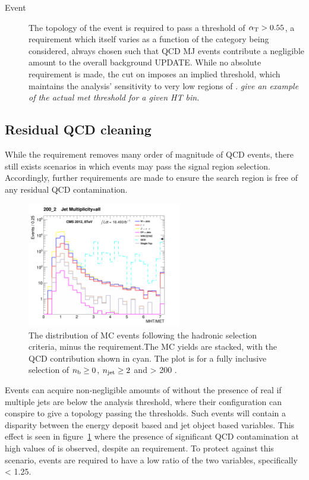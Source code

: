 \begin{description}
\item[Event]
The topology of the event is required to pass a threshold of $\alpha_{\text{T}} > 0.55$, 
a requirement which itself varies as a function of the \HT category being
considered, always
chosen such that QCD MJ events contribute a negligible amount to the overall 
background UPDATE. While no absolute \met requirement is made, the cut on 
\alphat imposes an implied threshold, which maintains the analysis'
sensitivity to very low regions of \met. \emph{give an example of the actual met
threshold for a given HT bin.}

\end{description}

\subsection{Residual QCD cleaning}

While the \alphat requirement removes many order of magnitude of QCD events,
there still exists scenarios in which events may pass the signal region
selection. Accordingly, further requirements are made to ensure the search
region is free of any residual QCD contamination.

\begin{figure}[ht!]
\centering
\includegraphics[width=0.6\textwidth]
{Figs/datamc/had/v1/Stacked_MHTovMET_all_200_upwards.png}
\caption{The \mhtmet distribution of MC events following the hadronic selection
criteria, minus the \mhtmet requirement.The MC yields are stacked,
with the QCD contribution shown in cyan. The plot is for a fully inclusive
selection of $n_{\text{b}} \geq 0$, $n_{\text{jet}} \geq 2$ and \HT > 200 \gev.}
\label{fig:full_mhtmet_distro}
\end{figure}

Events can acquire non-negligible amounts of \mht without the presence of
real \met if multiple jets are below the analysis threshold, where their
configuration can conspire to give a topology passing the \alphat thresholds.
Such events will contain a disparity between the energy deposit based \met and
jet object based \mht variables. This effect is seen in
figure~\ref{fig:full_mhtmet_distro} where the presence of significant QCD
contamination at high values of \mhtmet is observed, despite an \alphat
requirement. To protect against this scenario, events are required to have a low
ratio of the two variables, specifically \mhtmet < 1.25.

